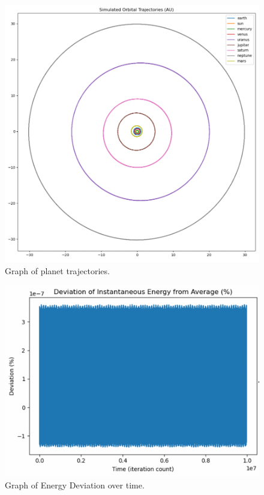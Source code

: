 \documentclass[a4paper,12pt]{article} %
\numberwithin{equation}{section} %
\numberwithin{figure}{section} %
\begin{document}
\begin{figure}[h]
  \centering
  \includegraphics[scale=0.4]{Trajectory.png}
  \caption{Graph of planet trajectories.}
  \label{fig:trajectory}
\end{figure}

\begin{figure}[h]
\centering
\includegraphics[scale=0.4]{EnergyDeviations.png}
\caption{Graph of Energy Deviation over time.}
\label{fig:energy}
\end{figure}
\end{document}
